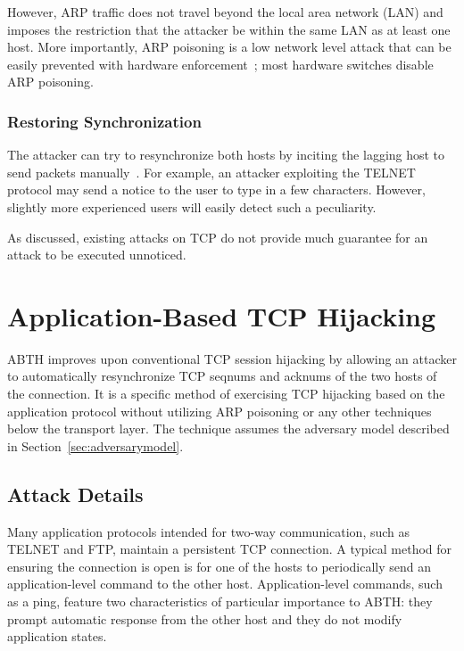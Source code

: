 \documentclass{sig-alternate}
\begin{document}
However, ARP traffic does not travel beyond the local area network (LAN) and imposes the restriction that the attacker be within the same LAN as at least one host.
More importantly, ARP poisoning is a low network level attack that can be easily prevented with hardware enforcement~\cite{spangler:sniffing}; most hardware switches disable ARP poisoning.

\subsubsection{Restoring Synchronization}

The attacker can try to resynchronize both hosts by inciting the lagging host to send packets manually~\cite{lam:resync}.
For example, an attacker exploiting the TELNET protocol may send a notice to the user to type in a few characters.
However, slightly more experienced users will easily detect such a peculiarity.

As discussed, existing attacks on TCP do not provide much guarantee for an attack to be executed unnoticed.

\section{Application-Based TCP Hijacking}
\label{sec:abth}

ABTH improves upon conventional TCP session hijacking by allowing an attacker to automatically resynchronize TCP seqnums and acknums of the two hosts of the connection.
It is a specific method of exercising TCP hijacking based on the application protocol without utilizing ARP poisoning or any other techniques below the transport layer.
The technique assumes the adversary model described in Section~\ref{sec:adversarymodel}. 

\subsection{Attack Details}

Many application protocols intended for two-way communication, such as TELNET and FTP, maintain a persistent TCP connection.
A typical method for ensuring the connection is open is for one of the hosts to periodically send an application-level command to the other host.
Application-level commands, such as a ping, feature two characteristics of particular importance to ABTH: they prompt automatic response from the other host and they do not modify application states.
\end{document}
